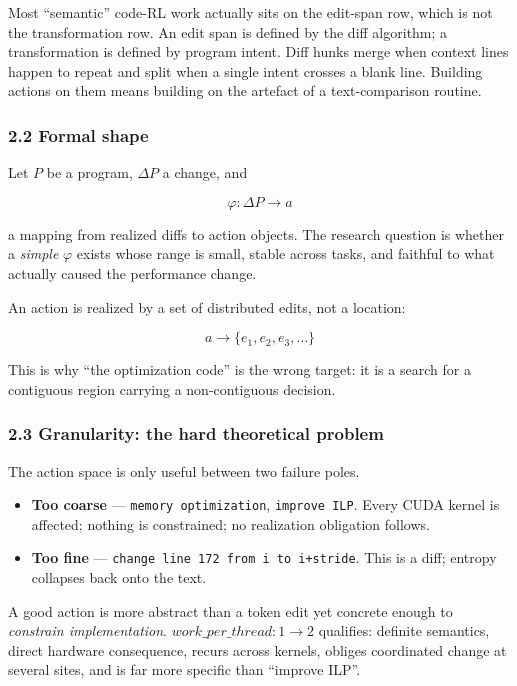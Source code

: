 \documentclass[
  11pt,
]{article}
\providecommand{\tightlist}{%
  \setlength{\itemsep}{0pt}\setlength{\parskip}{0pt}}
\begin{document}
Most ``semantic'' code-RL work actually sits on the edit-span row, which is not the transformation row. An edit span is defined by the diff algorithm; a transformation is defined by program intent. Diff hunks merge when context lines happen to repeat and split when a single intent crosses a blank line. Building actions on them means building on the artefact of a text-comparison routine.

\hypertarget{formal-shape}{%
\subsubsection{2.2 Formal shape}\label{formal-shape}}

Let \(P\) be a program, \(\Delta P\) a change, and

\[\varphi : \Delta P \to a\]

a mapping from realized diffs to action objects. The research question is whether a \emph{simple} \(\varphi\) exists whose range is small, stable across tasks, and faithful to what actually caused the performance change.

An action is realized by a set of distributed edits, not a location:

\[a \to \{ e_1, e_2, e_3, \dots \}\]

This is why ``the optimization code'' is the wrong target: it is a search for a contiguous region carrying a non-contiguous decision.

\hypertarget{granularity-the-hard-theoretical-problem}{%
\subsubsection{2.3 Granularity: the hard theoretical problem}\label{granularity-the-hard-theoretical-problem}}

The action space is only useful between two failure poles.

\begin{itemize}
\tightlist
\item
  \textbf{Too coarse} --- \texttt{memory\ optimization}, \texttt{improve\ ILP}. Every CUDA kernel is affected; nothing is constrained; no realization obligation follows.
\item
  \textbf{Too fine} --- \texttt{change\ line\ 172\ from\ i\ to\ i+stride}. This is a diff; entropy collapses back onto the text.
\end{itemize}

A good action is more abstract than a token edit yet concrete enough to \emph{constrain implementation}. \(\mathit{work\_per\_thread} : 1 \to 2\) qualifies: definite semantics, direct hardware consequence, recurs across kernels, obliges coordinated change at several sites, and is far more specific than ``improve ILP''.
\end{document}
